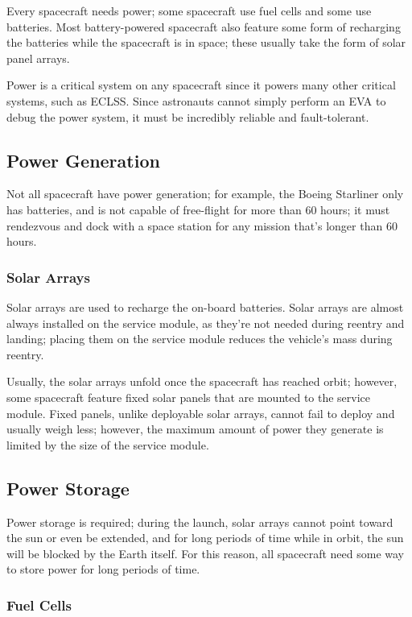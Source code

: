Every spacecraft needs power; some spacecraft use fuel cells and some
use batteries. Most battery-powered spacecraft also feature some form
of recharging the batteries while the spacecraft is in space; these
usually take the form of solar panel arrays.

Power is a critical system on any spacecraft since it powers many
other critical systems, such as ECLSS. Since astronauts cannot simply
perform an EVA to debug the power system, it must be incredibly
reliable and fault-tolerant.

\subsection{Power Generation}

Not all spacecraft have power generation; for example, the Boeing
Starliner only has batteries, and is not capable of free-flight for
more than 60 hours; it must rendezvous and dock with a space station
for any mission that's longer than 60 hours.

\subsubsection{Solar Arrays}

Solar arrays are used to recharge the on-board batteries. Solar arrays
are almost always installed on the service module, as they're not
needed during reentry and landing; placing them on the service module
reduces the vehicle's mass during reentry.

Usually, the solar arrays unfold once the spacecraft has reached
orbit; however, some spacecraft feature fixed solar panels that are
mounted to the service module. Fixed panels, unlike deployable solar
arrays, cannot fail to deploy and usually weigh less; however, the
maximum amount of power they generate is limited by the size of the
service module.

\subsection{Power Storage}

Power storage is required; during the launch, solar arrays cannot
point toward the sun or even be extended, and for long periods of time
while in orbit, the sun will be blocked by the Earth itself. For this
reason, all spacecraft need some way to store power for long periods
of time.

\subsubsection{Fuel Cells}

